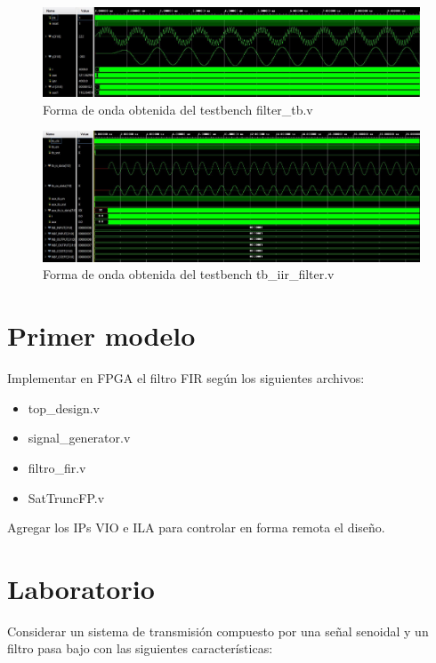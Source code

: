 \documentclass{article}
\begin{document}
\begin{figure}[ht]
    \centering
    \includegraphics[width=\textwidth]{sim-filter_tb.jpg}
    \caption{Forma de onda obtenida del testbench filter\_tb.v}
    \label{fig:filter_tb}
\end{figure}

\begin{figure}[ht]
    \centering
    \includegraphics[width=\textwidth]{sim-tb_filtro_fir.jpg}
    \caption{Forma de onda obtenida del testbench tb\_iir\_filter.v}
    \label{fig:tb_iir filter}
\end{figure}

\section*{Primer modelo}

Implementar en FPGA el filtro FIR según los siguientes archivos:

\begin{itemize}
    \item top\_design.v
    \item signal\_generator.v
    \item filtro\_fir.v
    \item SatTruncFP.v
\end{itemize}

Agregar los IPs VIO e ILA para controlar en forma remota el diseño.

\section*{Laboratorio}

Considerar un sistema de transmisión compuesto por una señal senoidal y un filtro pasa bajo con las siguientes características:
\end{document}
